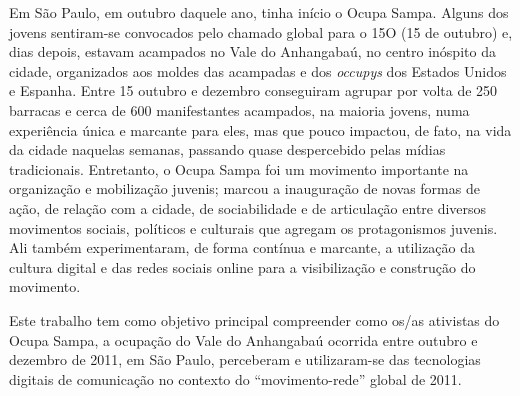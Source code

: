 Em São Paulo, em outubro daquele ano, tinha início o Ocupa Sampa. Alguns
dos jovens sentiram-se convocados pelo chamado global para o 15O (15 de
outubro) e, dias depois, estavam acampados no Vale do Anhangabaú, no
centro inóspito da cidade, organizados aos moldes das acampadas e dos
\emph{occupys} dos Estados Unidos e Espanha. Entre 15 outubro e dezembro
conseguiram agrupar por volta de 250 barracas e cerca de 600
manifestantes acampados, na maioria jovens, numa experiência única e
marcante para eles, mas que pouco impactou, de fato, na vida da cidade
naquelas semanas, passando quase despercebido pelas mídias tradicionais.
Entretanto, o Ocupa Sampa foi um movimento importante na organização e
mobilização juvenis; marcou a inauguração de novas formas de ação, de
relação com a cidade, de sociabilidade e de articulação entre diversos
movimentos sociais, políticos e culturais que agregam os protagonismos
juvenis. Ali também experimentaram, de forma contínua e marcante, a
utilização da cultura digital e das redes sociais online para a
visibilização e construção do movimento.

Este trabalho tem como objetivo principal compreender como os/as
ativistas do Ocupa Sampa, a ocupação do Vale do Anhangabaú ocorrida
entre outubro e dezembro de 2011, em São Paulo, perceberam e
utilizaram-se das tecnologias digitais de comunicação no contexto do
``movimento-rede'' global de 2011.

